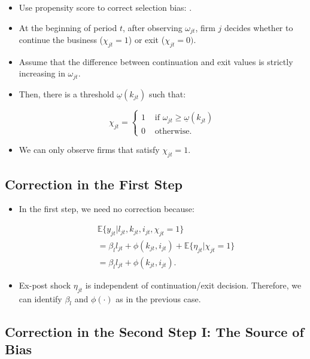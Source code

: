 \documentclass[]{book}
\providecommand{\tightlist}{%
  \setlength{\itemsep}{0pt}\setlength{\parskip}{0pt}}
\begin{document}
\begin{itemize}
\tightlist
\item
  Use propensity score to correct selection bias: \citet{Ahn1993}.
\item
  At the beginning of period \(t\), after observing \(\omega_{jt}\),
  firm \(j\) decides whether to continue the business
  (\(\chi_{jt} = 1\)) or exit (\(\chi_{jt} = 0)\).
\item
  Assume that the difference between continuation and exit values is
  strictly increasing in \(\omega_{jt}\).
\item
  Then, there is a threshold \(\underline{\omega}(k_{jt})\) such that:

  \begin{equation}
  \chi_{jt} = 
  \begin{cases}
  1 &\text{   if   } \omega_{jt} \ge \underline{\omega}(k_{jt})\\
  0 &\text{   otherwise.}
  \end{cases}
  \end{equation}
\item
  We can only observe firms that satisfy \(\chi_{jt} = 1\).
\end{itemize}

\subsection{Correction in the First
Step}\label{correction-in-the-first-step}

\begin{itemize}
\tightlist
\item
  In the first step, we need no correction because:

  \begin{equation}
  \begin{split}
  &\mathbb{E}\{y_{jt}|l_{jt}, k_{jt}, i_{jt}, \chi_{jt} = 1 \}\\
  &=\beta_l l_{jt} + \phi(k_{jt}, i_{jt}) + \mathbb{E}\{\eta_{jt}|\chi_{jt} = 1\}\\
  &= \beta_l l_{jt} + \phi(k_{jt}, i_{jt}).
  \end{split}
  \end{equation}
\item
  Ex-post shock \(\eta_{jt}\) is independent of continuation/exit
  decision. Therefore, we can identify \(\beta_l\) and \(\phi(\cdot)\)
  as in the previous case.
\end{itemize}

\subsection{Correction in the Second Step I: The Source of
Bias}\label{correction-in-the-second-step-i-the-source-of-bias}
\end{document}
